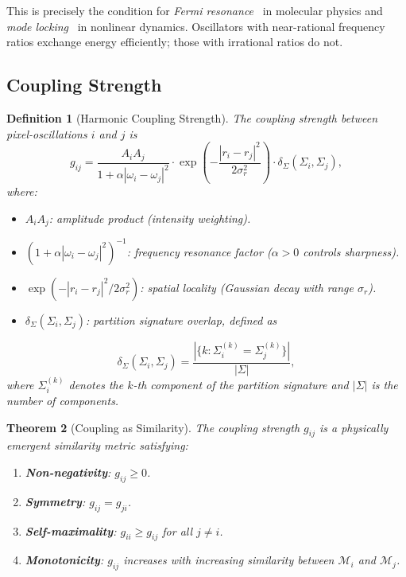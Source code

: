 \documentclass[11pt,twocolumn,a4paper]{article}
\newtheorem{theorem}{Theorem}[section]
\newtheorem{definition}[theorem]{Definition}
\begin{document}
This is precisely the condition for \emph{Fermi resonance}~\citep{fermi1931} in molecular physics and \emph{mode locking}~\citep{pikovsky2001, strogatz2015} in nonlinear dynamics. Oscillators with near-rational frequency ratios exchange energy efficiently; those with irrational ratios do not.

\subsection{Coupling Strength}

\begin{definition}[Harmonic Coupling Strength]\label{def:coupling}
The coupling strength between pixel-oscillations $i$ and $j$ is
\begin{equation}
    g_{ij} = \frac{A_i A_j}{1 + \alpha |\omega_i - \omega_j|^2} \cdot \exp\!\left(-\frac{|r_i - r_j|^2}{2\sigma_r^2}\right) \cdot \delta_{\Sigma}(\Sigma_i, \Sigma_j),
    \label{eq:coupling_strength}
\end{equation}
where:
\begin{itemize}[leftmargin=2em]
    \item $A_i A_j$: amplitude product (intensity weighting).
    \item $(1 + \alpha|\omega_i - \omega_j|^2)^{-1}$: frequency resonance factor ($\alpha > 0$ controls sharpness).
    \item $\exp(-|r_i - r_j|^2 / 2\sigma_r^2)$: spatial locality (Gaussian decay with range $\sigma_r$).
    \item $\delta_{\Sigma}(\Sigma_i, \Sigma_j)$: partition signature overlap, defined as
\end{itemize}
\begin{equation}
    \delta_{\Sigma}(\Sigma_i, \Sigma_j) = \frac{|\{k : \Sigma_i^{(k)} = \Sigma_j^{(k)}\}|}{|\Sigma|},
    \label{eq:signature_overlap}
\end{equation}
where $\Sigma_i^{(k)}$ denotes the $k$-th component of the partition signature and $|\Sigma|$ is the number of components.
\end{definition}

\begin{theorem}[Coupling as Similarity]\label{thm:coupling_similarity}
The coupling strength $g_{ij}$ is a physically emergent similarity metric satisfying:
\begin{enumerate}[label=(\roman*)]
    \item \textbf{Non-negativity}: $g_{ij} \geq 0$.
    \item \textbf{Symmetry}: $g_{ij} = g_{ji}$.
    \item \textbf{Self-maximality}: $g_{ii} \geq g_{ij}$ for all $j \neq i$.
    \item \textbf{Monotonicity}: $g_{ij}$ increases with increasing similarity between $\mathcal{M}_i$ and $\mathcal{M}_j$.
\end{enumerate}
\end{theorem}
\end{document}

